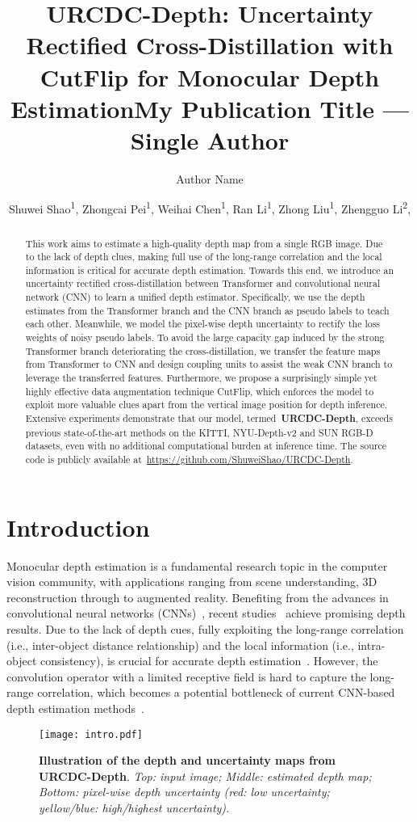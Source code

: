 \documentclass[letterpaper]{article} \usepackage{aaai23}  \usepackage{times}  \usepackage{helvet}  \usepackage{courier}  \usepackage[hyphens]{url}  \usepackage{graphicx} \urlstyle{rm} \def\UrlFont{\rm}  \usepackage{natbib}  \usepackage{caption} \frenchspacing  \setlength{\pdfpagewidth}{8.5in} \setlength{\pdfpageheight}{11in} \usepackage{algorithm}
\title{URCDC-Depth: Uncertainty Rectified Cross-Distillation with \\  CutFlip for Monocular Depth Estimation}
\title{My Publication Title --- Single Author}
\author {
    Author Name
}
\author {
Shuwei Shao\textsuperscript{\rm 1},
	Zhongcai Pei\textsuperscript{\rm 1},
	Weihai Chen\textsuperscript{\rm 1},
	Ran Li\textsuperscript{\rm 1},
	Zhong Liu\textsuperscript{\rm 1},
	Zhengguo Li\textsuperscript{\rm 2},
	
}
\begin{document}
\maketitle

\begin{abstract}
	This work aims to estimate a high-quality depth map from a single RGB image. Due to the lack of depth clues, making full use of the long-range correlation and the local information is critical for accurate depth estimation. Towards this end, we introduce an uncertainty rectified cross-distillation between Transformer and convolutional neural network (CNN) to learn a unified depth estimator. Specifically, we use the depth estimates from the Transformer branch and the CNN branch as pseudo labels to teach each other. Meanwhile, we model the pixel-wise depth uncertainty to rectify the loss weights of noisy pseudo labels. To avoid the large capacity gap induced by the strong Transformer branch deteriorating the cross-distillation, we transfer the feature maps from Transformer to CNN and design coupling units to assist the weak CNN branch to leverage the transferred features. Furthermore, we propose a surprisingly simple yet highly effective data augmentation technique CutFlip, which enforces the model to exploit more valuable clues apart from the vertical image position for depth inference. Extensive experiments demonstrate that our model, termed~\textbf{URCDC-Depth}, exceeds previous state-of-the-art methods on the KITTI, NYU-Depth-v2 and SUN RGB-D datasets, even with no additional computational burden at inference time. The source code is publicly available at~\url{https://github.com/ShuweiShao/URCDC-Depth}.
\end{abstract}

\section{Introduction}

Monocular depth estimation is a fundamental research topic in the computer vision community, with applications ranging from scene understanding, 3D reconstruction through to augmented reality. Benefiting from the advances in convolutional neural networks (CNNs)~\cite{He_2016_CVPR, tan2019efficientnet}, recent studies~\cite{lee2019big, bhat2021adabins} achieve promising depth results. Due to the lack of depth cues, fully exploiting the long-range correlation (i.e., inter-object distance relationship) and the local information (i.e., intra-object consistency), is crucial for accurate depth estimation~\cite{saxena2005learning}. However, the convolution operator with a limited receptive field is hard to capture the long-range correlation, which becomes a potential bottleneck of current CNN-based depth estimation methods~\cite{bhat2021adabins}.
\normalem
\begin{figure}[!htb]
\centering
	\texttt{[image: intro.pdf]}\caption{\textbf{Illustration of the depth and uncertainty maps from URCDC-Depth}. \emph{Top: input image; Middle: estimated depth map; Bottom: pixel-wise depth uncertainty (red: low uncertainty; yellow/blue: high/highest uncertainty).} }
	\label{Fig1}
\end{figure}
\end{document}
